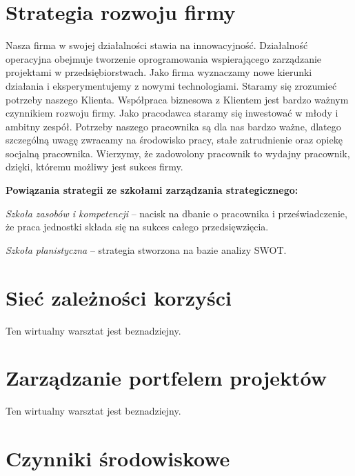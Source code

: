 
\section{Strategia rozwoju firmy}

Nasza firma w swojej działalności stawia na innowacyjność. Działalność operacyjna obejmuje tworzenie oprogramowania wspierającego zarządzanie projektami w przedsiębiorstwach. Jako firma wyznaczamy nowe kierunki działania i eksperymentujemy z nowymi technologiami. Staramy się zrozumieć potrzeby naszego Klienta. Współpraca biznesowa z Klientem jest bardzo ważnym czynnikiem rozwoju firmy. 
Jako pracodawca staramy się inwestować w młody i ambitny zespół. Potrzeby naszego pracownika są dla nas bardzo ważne, dlatego szczególną uwagę zwracamy na środowisko pracy, stałe zatrudnienie oraz opiekę socjalną pracownika. Wierzymy, że zadowolony pracownik to wydajny pracownik, dzięki, któremu możliwy jest sukces firmy.  

\textbf{Powiązania strategii ze szkołami zarządzania strategicznego:}

\textit{Szkoła zasobów i kompetencji} – nacisk na dbanie o pracownika i przeświadczenie, że praca jednostki składa się na sukces całego przedsięwzięcia.

\textit{Szkoła planistyczna} – strategia stworzona na bazie analizy SWOT.



\section{Sieć zależności korzyści}

Ten wirtualny warsztat jest beznadziejny.


\section{Zarządzanie portfelem projektów}

Ten wirtualny warsztat jest beznadziejny.


\section{Czynniki środowiskowe}

